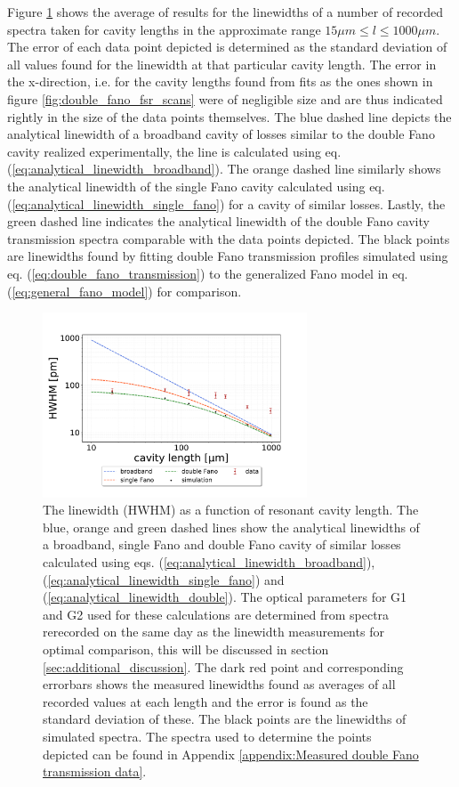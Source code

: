 Figure \ref{fig:HWHM_vs_l_double_fano_result} shows the average of results for the linewidths of a number of recorded spectra taken for cavity lengths in the approximate range $15 \mu m \leq l \leq 1000 \mu m$. The error of each data point depicted is determined as the standard deviation of all values found for the linewidth at that particular cavity length. The error in the x-direction, i.e. for the cavity lengths found from fits as the ones shown in figure \ref{fig:double_fano_fsr_scans} were of negligible size and are thus indicated rightly in the size of the data points themselves. The blue dashed line depicts the analytical linewidth of a broadband cavity of losses similar to the double Fano cavity realized experimentally, the line is calculated using eq. (\ref{eq:analytical_linewidth_broadband}). The orange dashed line similarly shows the analytical linewidth of the single Fano cavity calculated using eq. (\ref{eq:analytical_linewidth_single_fano}) for a cavity of similar losses. Lastly, the green dashed line indicates the analytical linewidth of the double Fano cavity transmission spectra comparable with the data points depicted. The black points are linewidths found by fitting double Fano transmission profiles simulated using eq. (\ref{eq:double_fano_transmission}) to the generalized Fano model in eq. (\ref{eq:general_fano_model}) for comparison.

\begin{figure}[h!]
    \centering
    \includegraphics[width=0.7\textwidth]{figures/results/double fano fits/HWHM_vs_cavity_length_result.pdf}
    \caption{The linewidth (HWHM) as a function of resonant cavity length. The blue, orange and green dashed lines show the analytical linewidths of a broadband, single Fano and double Fano cavity of similar losses calculated using eqs. (\ref{eq:analytical_linewidth_broadband}), (\ref{eq:analytical_linewidth_single_fano}) and (\ref{eq:analytical_linewidth_double}). The optical parameters for G1 and G2 used for these calculations are determined from spectra rerecorded on the same day as the linewidth measurements for optimal comparison, this will be discussed in section \ref{sec:additional_discussion}. The dark red point and corresponding errorbars shows the measured linewidths found as averages of all recorded values at each length and the error is found as the standard deviation of these. The black points are the linewidths of simulated spectra. The spectra used to determine the points depicted can be found in Appendix \ref{appendix:Measured double Fano transmission data}.}
    \label{fig:HWHM_vs_l_double_fano_result}
\end{figure}

